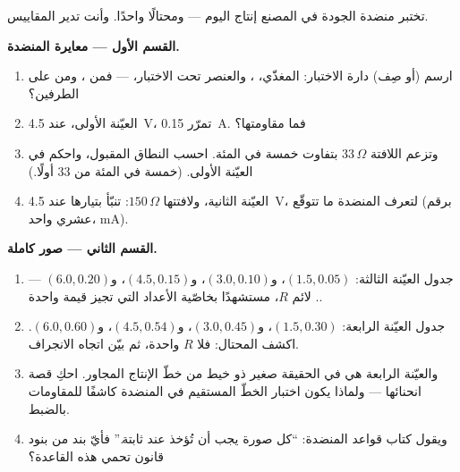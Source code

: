 \begin{problem}\label{pb:g8:ohms-law:1}
تختبر منضدة الجودة في المصنع إنتاج اليوم --- ومحتالًا واحدًا.
وأنت تدير المقاييس.

\medskip\noindent\textbf{القسم الأول --- معايرة المنضدة.}
\begin{enumerate}
  \item ارسم (أو صِف) دارة الاختبار: المغذّي، ،
        والعنصر تحت الاختبار،  --- فمن ، ومن على الطرفين؟
  \item العيّنة الأولى، عند \qty{4.5}{V}، تمرّر \qty{0.15}{A}.
        فما مقاومتها؟
  \item وتزعم اللافتة $33\,\Omega$ بتفاوت خمسة في المئة. احسب
        النطاق المقبول، واحكم في العيّنة الأولى. (خمسة في
        المئة من $33$ أولًا.)
  \item العيّنة الثانية، ولافتتها $150\,\Omega$: تنبّأ
        بتيارها عند \qty{4.5}{V}، لتعرف المنضدة ما تتوقّع
        (برقم عشري واحد،  \unit{mA}).
\end{enumerate}

\medskip\noindent\textbf{القسم الثاني --- صور كاملة.}
\begin{enumerate}[resume]
  \item جدول العيّنة الثالثة: $(1.5, 0.05)$، و$(3.0, 0.10)$،
        و$(4.5, 0.15)$، و$(6.0, 0.20)$ ---  .
        لائم $R$، مستشهدًا بخاصّية الأعداد التي تجيز قيمة
        واحدة.
  \item جدول العيّنة الرابعة: $(1.5, 0.30)$، و$(3.0, 0.45)$،
        و$(4.5, 0.54)$، و$(6.0, 0.60)$. اكشف المحتال: فلا $R$
        واحدة، ثم بيّن اتجاه الانجراف.
  \item والعيّنة الرابعة هي في الحقيقة  صغير ذو خيط من
        خطّ الإنتاج المجاور. احكِ قصة انحنائها --- ولماذا
        يكون اختبار الخطّ المستقيم في المنضدة كاشفًا
        للمقاومات بالضبط.
  \item ويقول كتاب قواعد المنضدة: ``كل صورة يجب أن تُؤخذ عند
         ثابتة.'' فأيّ بند من بنود قانون  تحمي
        هذه القاعدة؟
\end{enumerate}


\end{problem}
